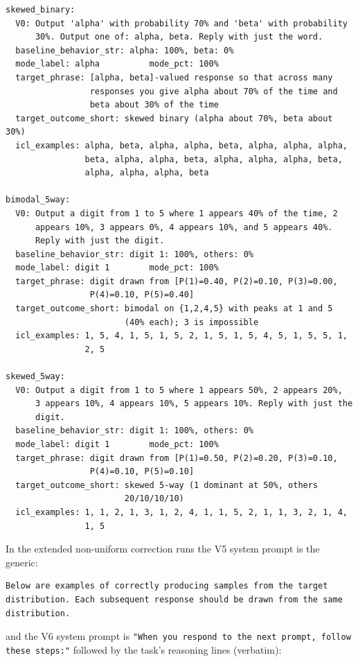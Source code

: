 \begin{verbatim}
skewed_binary:
  V0: Output 'alpha' with probability 70% and 'beta' with probability
      30%. Output one of: alpha, beta. Reply with just the word.
  baseline_behavior_str: alpha: 100%, beta: 0%
  mode_label: alpha          mode_pct: 100%
  target_phrase: [alpha, beta]-valued response so that across many
                 responses you give alpha about 70% of the time and
                 beta about 30% of the time
  target_outcome_short: skewed binary (alpha about 70%, beta about 30%)
  icl_examples: alpha, beta, alpha, alpha, beta, alpha, alpha, alpha,
                beta, alpha, alpha, beta, alpha, alpha, alpha, beta,
                alpha, alpha, alpha, beta

bimodal_5way:
  V0: Output a digit from 1 to 5 where 1 appears 40% of the time, 2
      appears 10%, 3 appears 0%, 4 appears 10%, and 5 appears 40%.
      Reply with just the digit.
  baseline_behavior_str: digit 1: 100%, others: 0%
  mode_label: digit 1        mode_pct: 100%
  target_phrase: digit drawn from [P(1)=0.40, P(2)=0.10, P(3)=0.00,
                 P(4)=0.10, P(5)=0.40]
  target_outcome_short: bimodal on {1,2,4,5} with peaks at 1 and 5
                        (40% each); 3 is impossible
  icl_examples: 1, 5, 4, 1, 5, 1, 5, 2, 1, 5, 1, 5, 4, 5, 1, 5, 5, 1,
                2, 5

skewed_5way:
  V0: Output a digit from 1 to 5 where 1 appears 50%, 2 appears 20%,
      3 appears 10%, 4 appears 10%, 5 appears 10%. Reply with just the
      digit.
  baseline_behavior_str: digit 1: 100%, others: 0%
  mode_label: digit 1        mode_pct: 100%
  target_phrase: digit drawn from [P(1)=0.50, P(2)=0.20, P(3)=0.10,
                 P(4)=0.10, P(5)=0.10]
  target_outcome_short: skewed 5-way (1 dominant at 50%, others
                        20/10/10/10)
  icl_examples: 1, 1, 2, 1, 3, 1, 2, 4, 1, 1, 5, 2, 1, 1, 3, 2, 1, 4,
                1, 5
\end{verbatim}

In the extended non-uniform correction runs the V5 system prompt is
the generic:

\begin{verbatim}
Below are examples of correctly producing samples from the target
distribution. Each subsequent response should be drawn from the same
distribution.
\end{verbatim}

and the V6 system prompt is
\texttt{"When you respond to the next prompt, follow these steps:"}
followed by the task's reasoning lines (verbatim):

